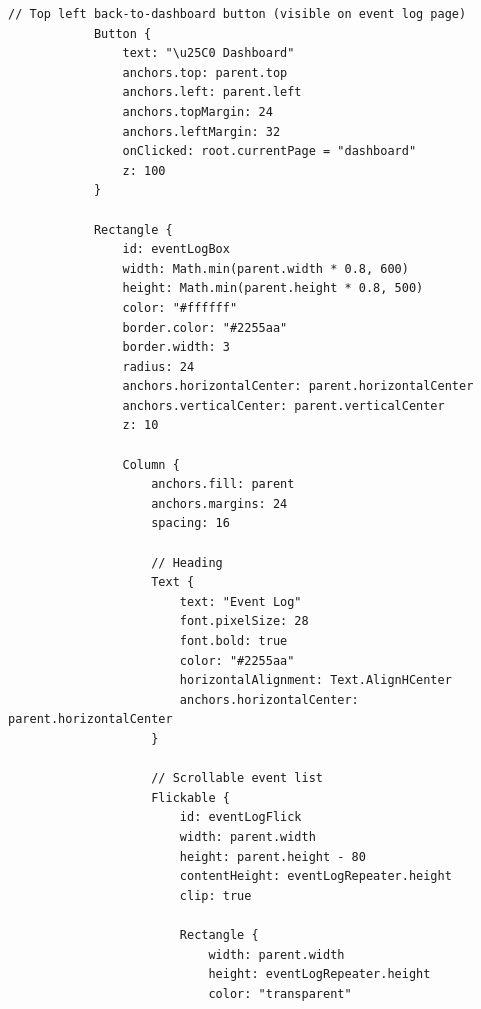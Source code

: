 \documentclass{report}
\begin{document}
\begin{lstlisting}[style=qmlstyle]
            // Top left back-to-dashboard button (visible on event log page)
            Button {
                text: "\u25C0 Dashboard"
                anchors.top: parent.top
                anchors.left: parent.left
                anchors.topMargin: 24
                anchors.leftMargin: 32
                onClicked: root.currentPage = "dashboard"
                z: 100
            }

            Rectangle {
                id: eventLogBox
                width: Math.min(parent.width * 0.8, 600)
                height: Math.min(parent.height * 0.8, 500)
                color: "#ffffff"
                border.color: "#2255aa"
                border.width: 3
                radius: 24
                anchors.horizontalCenter: parent.horizontalCenter
                anchors.verticalCenter: parent.verticalCenter
                z: 10

                Column {
                    anchors.fill: parent
                    anchors.margins: 24
                    spacing: 16

                    // Heading
                    Text {
                        text: "Event Log"
                        font.pixelSize: 28
                        font.bold: true
                        color: "#2255aa"
                        horizontalAlignment: Text.AlignHCenter
                        anchors.horizontalCenter: parent.horizontalCenter
                    }

                    // Scrollable event list
                    Flickable {
                        id: eventLogFlick
                        width: parent.width
                        height: parent.height - 80
                        contentHeight: eventLogRepeater.height
                        clip: true

                        Rectangle {
                            width: parent.width
                            height: eventLogRepeater.height
                            color: "transparent"


\end{lstlisting}
\end{document}
